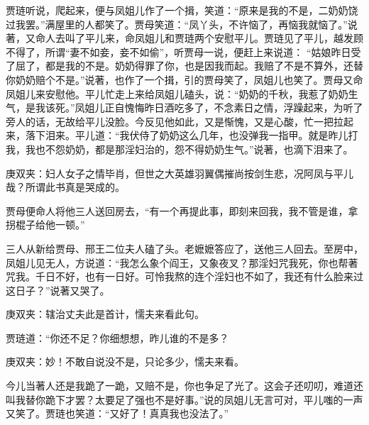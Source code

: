 \begin{parag}
    贾琏听说，爬起来，便与凤姐儿作了一个揖，笑道：“原来是我的不是，二奶奶饶过我罢。”满屋里的人都笑了。贾母笑道：“凤丫头，不许恼了，再恼我就恼了。”说著，又命人去叫了平儿来，命凤姐儿和贾琏两个安慰平儿。贾琏见了平儿，越发顾不得了，所谓“妻不如妾，妾不如偷”，听贾母一说，便赶上来说道： “姑娘昨日受了屈了，都是我的不是。奶奶得罪了你，也是因我而起。我赔了不是不算外，还替你奶奶赔个不是。”说著，也作了一个揖，引的贾母笑了，凤姐儿也笑了。贾母又命凤姐儿来安慰他。平儿忙走上来给凤姐儿磕头，说：“奶奶的千秋，我惹了奶奶生气，是我该死。”凤姐儿正自愧悔昨日酒吃多了，不念素日之情，浮躁起来，为听了旁人的话，无故给平儿没脸。今反见他如此，又是惭愧，又是心酸，忙一把拉起来，落下泪来。平儿道：“我伏侍了奶奶这么几年，也没弹我一指甲。就是昨儿打我，我也不怨奶奶，都是那淫妇治的，怨不得奶奶生气。”说著，也滴下泪来了。\begin{note}庚双夹：妇人女子之情毕肖，但世之大英雄羽翼偶摧尚按剑生悲，况阿凤与平儿哉？所谓此书真是哭成的。\end{note}贾母便命人将他三人送回房去，“有一个再提此事，即刻来回我，我不管是谁，拿拐棍子给他一顿。”
\end{parag}


\begin{parag}
    三人从新给贾母、邢王二位夫人磕了头。老嬷嬷答应了，送他三人回去。至房中，凤姐儿见无人，方说道：“我怎么象个阎王，又象夜叉？那淫妇咒我死，你也帮著咒我。千日不好，也有一日好。可怜我熬的连个淫妇也不如了，我还有什么脸来过这日子？”说著又哭了。\begin{note}庚双夹：辖治丈夫此是首计，懦夫来看此句。\end{note}贾琏道：“你还不足？你细想想，昨儿谁的不是多？\begin{note}庚双夹：妙！不敢自说没不是，只论多少，懦夫来看。\end{note}今儿当著人还是我跪了一跪，又赔不是，你也争足了光了。这会子还叨叨，难道还叫我替你跪下才罢？太要足了强也不是好事。”说的凤姐儿无言可对，平儿嗤的一声又笑了。贾琏也笑道：“又好了！真真我也没法了。”
\end{parag}


